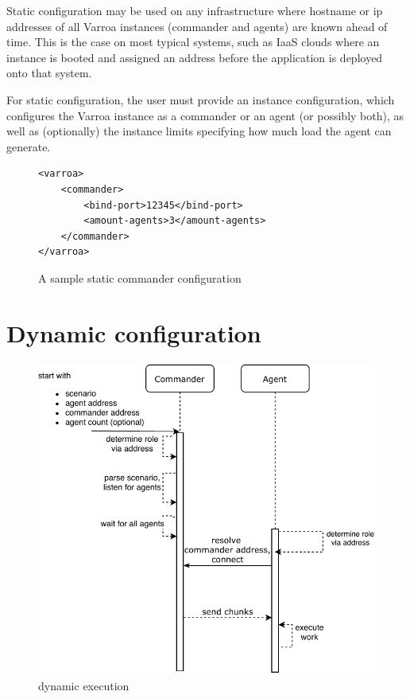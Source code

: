 Static configuration may be used on any infrastructure where hostname or ip addresses of all Varroa instances (commander and agents) are known ahead of time. This is the case on most typical systems, such as IaaS clouds where an instance is booted and assigned an address before the application is deployed onto that system.

For static configuration, the user must provide an instance configuration, which configures the Varroa instance as a commander or an agent (or possibly both), as well as (optionally) the instance limits specifying how much load the agent can generate.

\lstset{language=xml}

\begin{figure}

\begin{lstlisting}[frame=single]
<varroa>
    <commander>
        <bind-port>12345</bind-port>
        <amount-agents>3</amount-agents>
    </commander>
</varroa>
\end{lstlisting}
\caption{A sample static commander configuration}
\end{figure}
\section{Dynamic configuration}

\begin{figure}[h]
\begin{center}
\includegraphics[scale=0.65]{Resources/PDF/ExecutionDnsInit}
\caption{dynamic execution}
\label{pic:dynamicExecution}
\end{center}
\end{figure}

